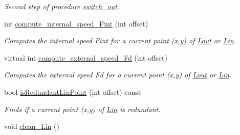 \begin{DoxyCompactItemize}
\begin{DoxyCompactList}\small\item\em Second step of procedure \hyperlink{classofeli_1_1_active_contour_a98af656dfc038e6f03c9e4bb67e39bd0}{switch\-\_\-out}. \end{DoxyCompactList}\item 
int \hyperlink{classofeli_1_1_active_contour_ad920bced735a1a78b0bf32e9f452dccb}{compute\-\_\-internal\-\_\-speed\-\_\-\-Fint} (int offset)
\begin{DoxyCompactList}\small\item\em Computes the internal speed Fint for a current point ({\itshape x},{\itshape y}) of \hyperlink{classofeli_1_1_active_contour_a31e0eb18a7ea6ae90acf66ed018fcd85}{Lout} or \hyperlink{classofeli_1_1_active_contour_a7662d4f5c8b87d3e642b08b7e341bd79}{Lin}. \end{DoxyCompactList}\item 
virtual int \hyperlink{classofeli_1_1_active_contour_ae3871b40f2f3e27ae0d75775798cdee1}{compute\-\_\-external\-\_\-speed\-\_\-\-Fd} (int offset)
\begin{DoxyCompactList}\small\item\em Computes the external speed {\itshape Fd} for a current point ({\itshape x},{\itshape y}) of \hyperlink{classofeli_1_1_active_contour_a31e0eb18a7ea6ae90acf66ed018fcd85}{Lout} or \hyperlink{classofeli_1_1_active_contour_a7662d4f5c8b87d3e642b08b7e341bd79}{Lin}. \end{DoxyCompactList}\item 
bool \hyperlink{classofeli_1_1_active_contour_ac734c690a9d10f37b99b6803af335d1d}{is\-Redundant\-Lin\-Point} (int offset) const 
\begin{DoxyCompactList}\small\item\em Finds if a current point ({\itshape x},{\itshape y}) of \hyperlink{classofeli_1_1_active_contour_a7662d4f5c8b87d3e642b08b7e341bd79}{Lin} is redundant. \end{DoxyCompactList}\item 
\hypertarget{classofeli_1_1_active_contour_a1769065c078585aeab98477d0f944b44}{void \hyperlink{classofeli_1_1_active_contour_a1769065c078585aeab98477d0f944b44}{clean\-\_\-\-Lin} ()}\label{classofeli_1_1_active_contour_a1769065c078585aeab98477d0f944b44}


\end{DoxyCompactItemize}
